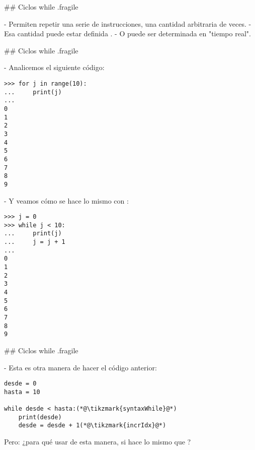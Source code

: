 ## Ciclos while {.fragile}

- Permiten repetir una serie de instrucciones, una cantidad arbitraria de veces.
    - Esa cantidad puede estar definida .
    - O puede ser determinada en "tiempo real".

\pause

\bgnblockdefinition
{} \newline
\trmblockdefinition

## Ciclos while {.fragile}


\bgncolumns[-2ex]

- Analicemos el siguiente código:

\begin{lstlisting}[style=frame03]
>>> for j in range(10):
...     print(j)
... 
0
1
2
3
4
5
6
7
8
9
\end{lstlisting}


- Y veamos cómo se hace lo mismo con :

\begin{lstlisting}[style=frame03]
>>> j = 0
>>> while j < 10:
...     print(j)
...     j = j + 1
... 
0
1
2
3
4
5
6
7
8
9
\end{lstlisting}

\trmcolumns

## Ciclos while {.fragile}

- Esta es otra manera de hacer el código anterior:

\begin{lstlisting}[style=frame03]
desde = 0
hasta = 10

while desde < hasta:(*@\tikzmark{syntaxWhile}@*)
    print(desde)
    desde = desde + 1(*@\tikzmark{incrIdx}@*)
\end{lstlisting}


\vfill

\bgnblockdanger
Pero: ¿para qué usar  de esta manera, si hace lo mismo que ?
\trmblockdanger

